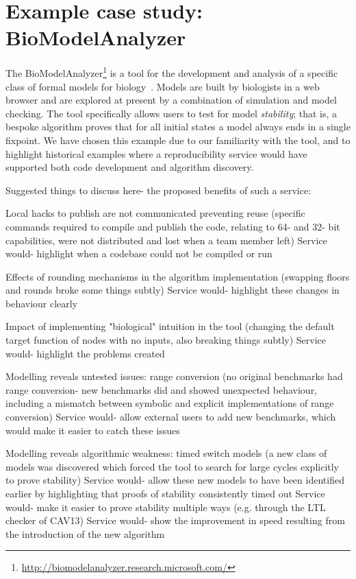 \documentclass{llncs}
\begin{document}
\section{Example case study: BioModelAnalyzer}\label{example}


The
BioModelAnalyzer\footnote{\url{http://biomodelanalyzer.research.microsoft.com/}}
is a tool for the development and analysis of a specific class of
formal models for
biology~\cite{benque2012,cook-et-al:2010,cook2014}. Models are built
by biologists in a web browser and are explored at present by a
combination of simulation and model checking. The tool specifically
allows users to test for model \emph{stability}; that is, a bespoke
algorithm proves that for all initial states a model always ends in a
single fixpoint. We have chosen this example due to our familiarity
with the tool, and to highlight historical examples where a
reproducibility service would have supported both code development and
algorithm discovery.

Suggested things to discuss here- the proposed benefits of such a service:

Local hacks to publish are not communicated preventing reuse
(specific commands required to compile and publish the code, 
relating to 64- and 32- bit capabilities, were not distributed
and lost when a team member left)
Service would- highlight when a codebase could not be compiled or run

Effects of rounding mechanisms in the algorithm implementation
(swapping floors and rounds broke some things subtly)
Service would- highlight these changes in behaviour clearly

Impact of implementing "biological" intuition in the tool
(changing the default target function of nodes with no inputs, also
breaking things subtly)
Service would- highlight the problems created

Modelling reveals untested issues: range conversion
(no original benchmarks had range conversion- new benchmarks did
and showed unexpected behaviour, including a mismatch between symbolic
and explicit implementations of range conversion)
Service would- allow external users to add new benchmarks, which would make it
easier to catch these issues

Modelling reveals algorithmic weakness: timed switch models 
(a new class of models was discovered which forced the tool to search 
for large cycles explicitly to prove stability)
Service would- allow these new models to have been identified earlier
by highlighting that proofs of stability consistently timed out
Service would- make it easier to prove stability multiple ways (e.g.
through the LTL checker of CAV13)
Service would- show the improvement in speed resulting from the introduction
of the new algorithm
\end{document}
